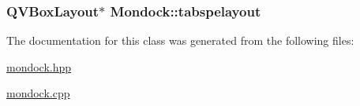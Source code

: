 \hypertarget{class_mondock_af59762fb339ae8c0821fada75433e8fb}{
\subsubsection[{tabspelayout}]{\setlength{\rightskip}{0pt plus 5cm}Q\+V\+Box\+Layout$\ast$ Mondock\+::tabspelayout\hspace{0.3cm}{\ttfamily [private]}}}\label{class_mondock_af59762fb339ae8c0821fada75433e8fb}


The documentation for this class was generated from the following files\+:\begin{DoxyCompactItemize}
\item 
\hyperlink{mondock_8hpp}{mondock.\+hpp}\item 
\hyperlink{mondock_8cpp}{mondock.\+cpp}\end{DoxyCompactItemize}
